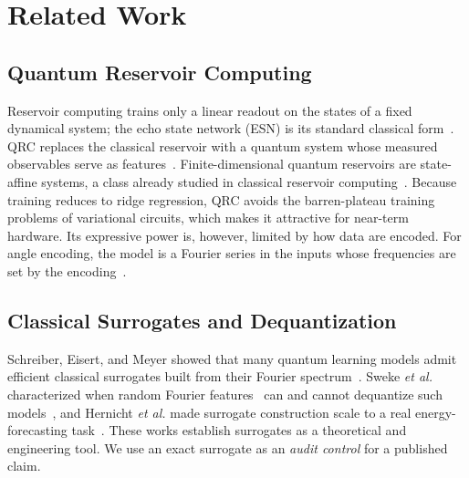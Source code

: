 \documentclass{ieeeaccess}
\begin{document}
\section{Related Work}
\label{sec:related}

\subsection{Quantum Reservoir Computing}
Reservoir computing trains only a linear readout on the states of a fixed dynamical system; the echo state network (ESN) is its standard classical form~\cite{jaeger2001}. QRC replaces the classical reservoir with a quantum system whose measured observables serve as features~\cite{fujii2017,mujal2021}. Finite-dimensional quantum reservoirs are state-affine systems, a class already studied in classical reservoir computing~\cite{martinezpena2023}. Because training reduces to ridge regression, QRC avoids the barren-plateau training problems of variational circuits, which makes it attractive for near-term hardware. Its expressive power is, however, limited by how data are encoded. For angle encoding, the model is a Fourier series in the inputs whose frequencies are set by the encoding~\cite{schuld2021}.

\subsection{Classical Surrogates and Dequantization}
Schreiber, Eisert, and Meyer showed that many quantum learning models admit efficient classical surrogates built from their Fourier spectrum~\cite{schreiber2023}. Sweke \emph{et al.} characterized when random Fourier features~\cite{rahimi2007} can and cannot dequantize such models~\cite{sweke2025}, and Hernicht \emph{et al.} made surrogate construction scale to a real energy-forecasting task~\cite{hernicht2026}. These works establish surrogates as a theoretical and engineering tool. We use an exact surrogate as an \emph{audit control} for a published claim.
\end{document}
